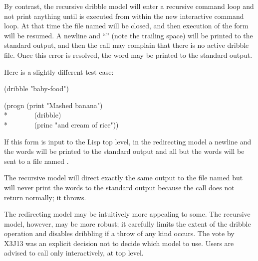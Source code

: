 \begin{defun}[Function]
\begin{new}
By contrast, the recursive dribble model will enter a recursive command
loop and not print anything until  is executed from within
the new interactive command loop.  At that time the file named
 will be closed, and then execution of the
 form will be resumed.  A newline and ``'' (note the trailing space)
will be printed to the standard output, and then the call
 may complain that there is no active dribble file.
Once this error is resolved, the word  may be printed
to the standard output.

Here is a slightly different test case:
\begin{lisp}
(dribble "baby-food")
\end{lisp}
\begin{lisp}
(progn (print "Mashed banana") \\*
~~~~~~~(dribble) \\*
~~~~~~~(princ "and cream of rice"))
\end{lisp}
If this form is input to the Lisp top level, in the redirecting model
a newline and the words
 will be printed to the standard output
and all but the words
 will be sent to a file named .

The recursive model will direct exactly the same output to the file
named  but will never print the words
 to the standard output because the call
 does not return normally; it throws.

The redirecting model may be intuitively more appealing to some.
The recursive model, however, may be more robust; it carefully limits
the extent of the dribble operation and disables dribbling if a
throw of any kind occurs.  The vote by X3J13 was an explicit decision
not to decide which model to use.  Users are advised to call 
only interactively, at top level.
\end{new}
\end{defun}


